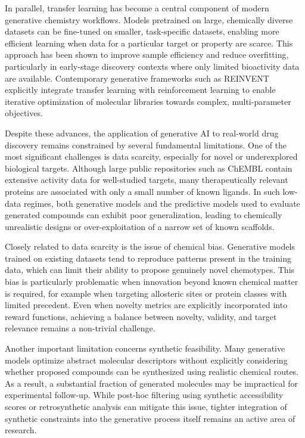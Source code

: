 In parallel, transfer learning has become a central component of modern generative chemistry workflows\cite{Segler2017GeneratingNetworks,Gomez-Bombarelli2018AutomaticMolecules}. Models pretrained on large, chemically diverse datasets can be fine-tuned on smaller, task-specific datasets, enabling more efficient learning when data for a particular target or property are scarce. This approach has been shown to improve sample efficiency and reduce overfitting, particularly in early-stage discovery contexts where only limited bioactivity data are available. Contemporary generative frameworks such as REINVENT explicitly integrate transfer learning with reinforcement learning to enable iterative optimization of molecular libraries towards complex, multi-parameter objectives\cite{Blaschke2020ReinventDesign,Loeffler2024ReinventDesign}.

Despite these advances, the application of generative AI to real-world drug discovery remains constrained by several fundamental limitations. One of the most significant challenges is data scarcity, especially for novel or underexplored biological targets. Although large public repositories such as ChEMBL contain extensive activity data for well-studied targets, many therapeutically relevant proteins are associated with only a small number of known ligands. In such low-data regimes, both generative models and the predictive models used to evaluate generated compounds can exhibit poor generalization, leading to chemically unrealistic designs or over-exploitation of a narrow set of known scaffolds\cite{Walters2020AssessingChemistry,Tang2024AGeneration}.

Closely related to data scarcity is the issue of chemical bias. Generative models trained on existing datasets tend to reproduce patterns present in the training data, which can limit their ability to propose genuinely novel chemotypes. This bias is particularly problematic when innovation beyond known chemical matter is required, for example when targeting allosteric sites or protein classes with limited precedent. Even when novelty metrics are explicitly incorporated into reward functions, achieving a balance between novelty, validity, and target relevance remains a non-trivial challenge.

Another important limitation concerns synthetic feasibility. Many generative models optimize abstract molecular descriptors without explicitly considering whether proposed compounds can be synthesized using realistic chemical routes. As a result, a substantial fraction of generated molecules may be impractical for experimental follow-up. While post-hoc filtering using synthetic accessibility scores or retrosynthetic analysis can mitigate this issue, tighter integration of synthetic constraints into the generative process itself remains an active area of research\cite{Tang2024AGeneration}.

